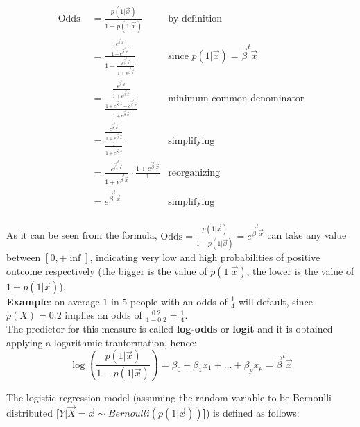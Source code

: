 	\begin{align*}
	  \text{Odds } &= \frac{p(1|\vec{x})}{1 - p(1|\vec{x})}
	               & \text{by definition}\\
	               &= \frac{\frac{e^{\vec{\beta}^t\vec{x}}}{1 + e^{\vec{\beta}^t\vec{x}}}}
	                       {1 - \frac{e^{\vec{\beta}^t\vec{x}}}{1 + e^{\vec{\beta}^t\vec{x}}}}
	               & \text{since } p(1|\vec{x}) = \vec{\beta}^t\vec{x} \\
	               &= \frac{\frac{e^{\vec{\beta}^t\vec{x}}}{1 + e^{\vec{\beta}^t\vec{x}}}}
	                       {\frac{1 + e^{\vec{\beta}^t\vec{x}} - e^{\vec{\beta}^t\vec{x}}}{1 + e^{\vec{\beta}^t\vec{x}}}}
	               & \text{minimum common denominator}\\
	               &= \frac{\frac{e^{\vec{\beta}^t\vec{x}}}{1 + e^{\vec{\beta}^t\vec{x}}}}
	                       {\frac{1}{1 + e^{\vec{\beta}^t\vec{x}}}}
	               & \text{simplifying}\\
	               &= \frac{e^{\vec{\beta}^t\vec{x}}}{1 + e^{\vec{\beta}^t\vec{x}}} \cdot
	                       \frac{1 + e^{\vec{\beta}^t\vec{x}}}{1}
	               & \text{reorganizing}\\
	               &= e^{\vec{\beta}^t\vec{x}}
	               & \text{simplifying}\\
	\end{align*}
    
	As it can be seen from the formula, $\text{Odds} = \frac{p(1|\vec{x})}{1 -
p(1|\vec{x})} = e^{\vec{\beta}^t\vec{x}} $ can take any value between $[0,
+\inf]$, indicating very low and high probabilities of positive outcome
respectively (the bigger is the value of $p(1|\vec{x})$, the lower is the value
of $1- p(1|\vec{x})$). \\

\noindent \textbf{Example}: on average $1$ in $5$ people with an odds of
$\frac{1}{4}$ will default, since $p(X) = 0.2$ implies an odds of
$\frac{0.2}{1-0.2} = \frac{1}{4}$. \\

The predictor for this measure is called \textbf{log-odds} or \textbf{logit} and
it is obtained applying a logarithmic tranformation, hence:
    $$
    \log\left(\frac{p(1|\vec{x})}{1 - p(1|\vec{x})}\right) 
    = \beta_0 + \beta_1 x_1 + \dots + \beta_px_p 
    = \vec{\beta}^t\vec{x}
    $$
    
    The logistic regression model (assuming the random variable to be Bernoulli
    distributed \textbf{[}$Y|\vec{X} = \vec{x} \sim
    Bernoulli(p(1|\vec{x}))$\textbf{]}) is defined as follows:

